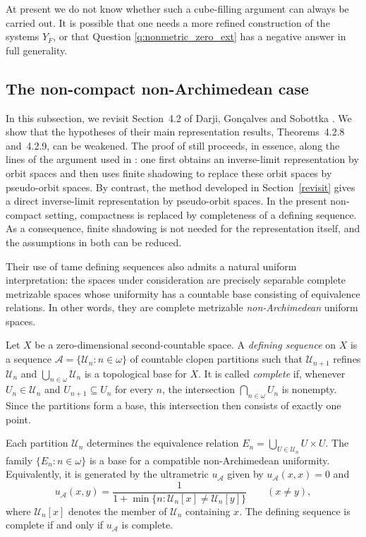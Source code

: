 \documentclass[12pt]{amsart}
\theoremstyle{definition}
\numberwithin{equation}{section}
\theoremstyle{remark}
\begin{document}
At present we do not know whether such a cube-filling argument can always be
carried out. It is possible that one needs a more refined construction of the
systems $Y_F$, or that Question \ref{q:nonmetric_zero_ext} has a negative
answer in full generality.

\subsection{The non-compact non-Archimedean case}
\label{subsec:nonarch}

In this subsection, we revisit Section~4.2 of Darji, Gon\c{c}alves and
Sobottka \cite{Darji}. We show that the hypotheses of their main
representation results, Theorems~4.2.8 and~4.2.9, can be weakened.
The proof of \cite[Theorem~4.2.8]{Darji} still proceeds, in essence, along
the lines of the argument used in \cite[Theorem~18]{GM}: one first obtains
an inverse-limit representation by orbit spaces and then uses finite
shadowing to replace these orbit spaces by pseudo-orbit spaces. By contrast,
the method developed in Section~\ref{revisit} gives a direct inverse-limit
representation by pseudo-orbit spaces. In the present non-compact setting,
compactness is replaced by completeness of a defining sequence. As a
consequence, finite shadowing is not needed for the representation itself,
and the assumptions in both \cite[Theorems~4.2.8 and~4.2.9]{Darji} can be
reduced.

Their use of tame defining sequences also admits a natural uniform
interpretation: the spaces under consideration are precisely separable
complete metrizable spaces whose uniformity has a countable base consisting
of equivalence relations. In other words, they are complete metrizable
\emph{non-Archimedean} uniform spaces.

 Let
$X$ be a zero-dimensional second-countable space. A \emph{defining sequence}
on $X$ is a sequence $\mathcal A=\{\mathcal U_n:n\in\omega\}$ of countable
clopen partitions such that $\mathcal U_{n+1}$ refines $\mathcal U_n$ and
$\bigcup_{n\in\omega}\mathcal U_n$ is a topological base for $X$. It is called
\emph{complete} if, whenever $U_n\in\mathcal U_n$ and
$U_{n+1}\subseteq U_n$ for every $n$, the intersection
$\bigcap_{n\in\omega}U_n$ is nonempty. Since the partitions form a base,
this intersection then consists of exactly one point.

Each partition $\mathcal U_n$ determines the equivalence relation
$E_n=\bigcup_{U\in\mathcal U_n}U\times U$. The family $\{E_n:n\in\omega\}$
is a base for a compatible non-Archimedean uniformity. Equivalently, it is
generated by the ultrametric $u_{\mathcal A}$ given by
$u_{\mathcal A}(x,x)=0$ and
\[
u_{\mathcal A}(x,y)
=
\frac{1}{1+\min\{n:\mathcal U_n[x]\neq\mathcal U_n[y]\}}
\qquad (x\neq y),
\]
where $\mathcal U_n[x]$ denotes the member of $\mathcal U_n$ containing
$x$. The defining sequence is complete if and only if
$u_{\mathcal A}$ is complete.
\end{document}
